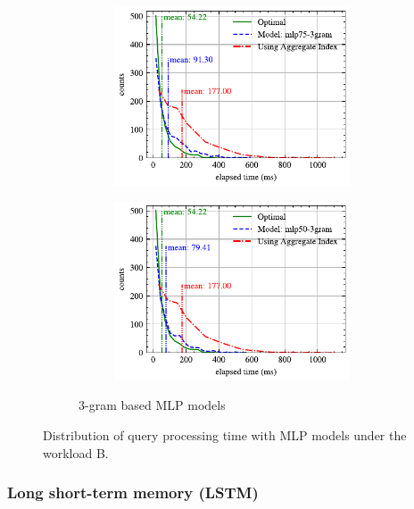 \documentclass[conference]{IEEEtran}
\begin{document}
\begin{figure}[!th]
\begin{subfigure}{0.45\textwidth}
\begin{subfigure}{\textwidth}
			\includegraphics[]{graphics/perf_dist_mlp75_3gram_B.pdf}
		\end{subfigure}
		\vfill
		\begin{subfigure}{\textwidth}
			\centering
			\includegraphics[]{graphics/perf_dist_mlp50_3gram_B.pdf}
		\end{subfigure}
		\caption{3-gram based MLP models}
	\end{subfigure}
	\caption{Distribution of query processing time with MLP models under the workload B.}
	\label{fig:mlp_perf_all_B}
\end{figure}

\subsubsection{Long short-term memory (LSTM)}

\end{document}
